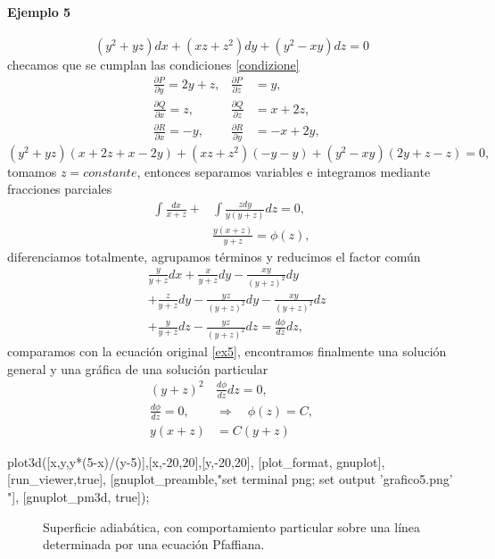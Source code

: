 \documentclass{article}
\theoremstyle{definition} \newtheorem{defi}{Definici\'on}
\theoremstyle{definition} \newtheorem{teo}{Teorema}
\theoremstyle{definition} \newtheorem{cor}{Corolario}
\begin{document}
\paragraph{Ejemplo 5}
\begin{equation}\label{ex5}
(y^2+yz)dx+(xz+z^2)dy+(y^2-xy)dz=0
\end{equation}
checamos que se cumplan las condiciones \eqref{condizione}
\begin{align*}
&\frac{\partial P}{\partial y} = 2y+z,   &\frac{\partial P}{\partial z} &= y,\\
&\frac{\partial Q}{\partial x} = z,   &\frac{\partial Q}{\partial z} &= x+2z,\\
&\frac{\partial R}{\partial x} = -y,   &\frac{\partial R}{\partial y} &= -x+2y,
\end{align*}
$$(y^2+yz)(x+2z+x-2y)+(xz+z^2)(-y-y)+(y^2-xy)(2y+z-z)=0,$$
tomamos $z=constante$, entonces separamos variables e integramos mediante fracciones parciales
\begin{align*}
\int \frac{dx}{x+z} +& \int \frac{zdy}{y(y+z)}dz = 0,\\
&\frac{y(x+z)}{y+z} = \phi(z),
\end{align*}
diferenciamos totalmente, agrupamos t\'erminos y reducimos el factor com\'un
\begin{align*}
&\frac{y}{y+z}dx + \frac{x}{y+z}dy - \frac{xy}{(y+z)^2}dy\\
&+\frac{z}{y+z}dy - \frac{yz}{(y+z)^2}dy - \frac{xy}{(y+z)^2}dz\\
&+\frac{y}{y+z}dz - \frac{yz}{(y+z)^2}dz = \frac{d\phi}{dz}dz,
\end{align*}
comparamos con la ecuaci\'on original \eqref{ex5}, encontramos finalmente una soluci\'on general y una gr\'afica de una soluci\'on particular
\begin{align*}
(y+z)^2&\frac{d\phi}{dz}dz=0,\\
\frac{d\phi}{dz}=0, \quad&\Rightarrow \quad \phi(z)=C,\\
y(x+z)&=C(y+z)
\end{align*}
\begin{maximacmd}
   plot3d([x,y,y*(5-x)/(y-5)],[x,-20,20],[y,-20,20],
    [plot_format, gnuplot],
    [run_viewer,true],
    [gnuplot_preamble,"set terminal png; set output 'grafico5.png' "],
    [gnuplot_pm3d, true]);
\end{maximacmd}
\begin{figure}
\caption{Superficie adiab\'atica, con comportamiento particular sobre una l\'inea determinada por una ecuaci\'on Pfaffiana.}
\end{figure}
\end{document}
